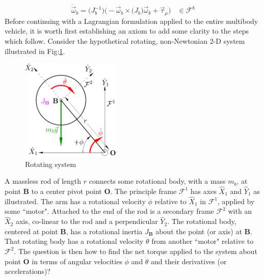 \begin{equation}
\dot{\vec{\omega}}_b=\big(J_b^{-1}\big)\Big(-\vec{\omega}_b\times\big(J_b\big)\vec{\omega}_b+\vec{\tau}_{\mu}\Big)~~~~\in\mathcal{F}^b
\end{equation}
Before continuing with a Lagrangian formulation applied to the entire multibody vehicle, it is worth first establishing an axiom to add some clarity to the steps which follow. Consider the hypothetical rotating, non-Newtonian 2-D system illustrated in Fig:\ref{fig:lemma-1}. 
\begin{figure}[htbp]
\centering
\includegraphics[width=0.43\textwidth]{figs/lemma-1}
\vspace{-6pt}
\caption{Rotating system}
\label{fig:lemma-1}
\vspace{-18pt}
\end{figure} 
\par
A massless rod of length $r$ connects some rotational body, with a mass $m_b$, at point $\mathbf{B}$ to a center pivot point $\mathbf{O}$. The principle frame $\mathcal{F}^{1}$ has axes $\hat{X}_1$ and $\hat{Y}_1$ as illustrated. The arm has a rotational velocity $\dot{\phi}$ relative to $\hat{X}_1$ in $\mathcal{F}^{1}$, applied by some ``motor". Attached to the end of the rod is a secondary frame $\mathcal{F}^2$ with an $\hat{X}_2$ axis, co-linear to the rod and a perpendicular $\hat{Y}_2$. The rotational body, centered at point $\mathbf{B}$, has a rotational inertia $J_\mathbf{B}$ about the point (or axis) at $\mathbf{B}$. That rotating body has a rotational velocity $\dot{\theta}$ from another ``motor" relative to $\mathcal{F}^2$. The question is then how to find the net torque applied to the system about point $\mathbf{O}$ in terms of angular velocities $\dot{\phi}$ and $\dot{\theta}$ and their derivatives (or accelerations)?
